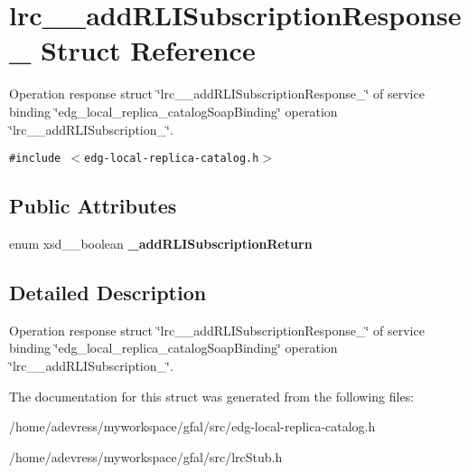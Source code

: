\section{lrc\_\-\_\-add\-RLISubscription\-Response\_\- Struct Reference}
\label{structlrc____addRLISubscriptionResponse__}
Operation response struct \char`\"{}lrc\_\-\_\-add\-RLISubscription\-Response\_\-\char`\"{} of service binding \char`\"{}edg\_\-local\_\-replica\_\-catalog\-Soap\-Binding\char`\"{} operation \char`\"{}lrc\_\-\_\-add\-RLISubscription\_\-\char`\"{}.  


{\tt \#include $<$edg-local-replica-catalog.h$>$}

\subsection*{Public Attributes}
\begin{CompactItemize}
\item 
enum xsd\_\-\_\-boolean \textbf{\_\-add\-RLISubscription\-Return}\label{structlrc____addRLISubscriptionResponse___32b68f983bcfde42317ce06bce5c7027}

\end{CompactItemize}


\subsection{Detailed Description}
Operation response struct \char`\"{}lrc\_\-\_\-add\-RLISubscription\-Response\_\-\char`\"{} of service binding \char`\"{}edg\_\-local\_\-replica\_\-catalog\-Soap\-Binding\char`\"{} operation \char`\"{}lrc\_\-\_\-add\-RLISubscription\_\-\char`\"{}. 



The documentation for this struct was generated from the following files:\begin{CompactItemize}
\item 
/home/adevress/myworkspace/gfal/src/edg-local-replica-catalog.h\item 
/home/adevress/myworkspace/gfal/src/lrc\-Stub.h\end{CompactItemize}
